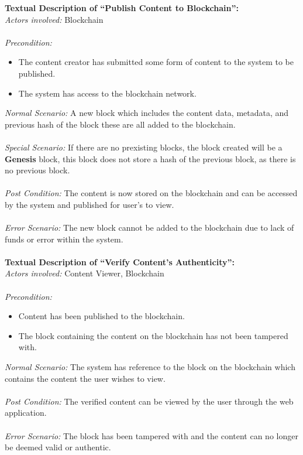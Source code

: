 \noindent
\textbf{Textual Description of “Publish Content to Blockchain”:} \\
\textit{Actors involved:} Blockchain  \\ \\
\textit{Precondition:} 
	\begin{itemize}
		\item The content creator has submitted some form of content to the system to be published.
		\item The system has access to the blockchain network. 
	\end{itemize}
\textit{Normal Scenario:} A new block which includes the content data, metadata, and previous hash of the block
						  these are all added to the blockchain. \\ \\
\textit{Special Scenario:} If there are no prexisting blocks, the block created will be a \textbf{Genesis} block,
						   this block does not store a hash of the previous block, as there is no previous block. \\ \\
\textit{Post Condition:} The content is now stored on the blockchain and can be accessed by the system 
						 and published for user’s to view. \\ \\
\textit{Error Scenario:} The new block cannot be added to the blockchain due to lack of funds 
						 or error within the system. \\ \\

\noindent
\textbf{Textual Description of “Verify Content's Authenticity”:} \\
\textit{Actors involved:} Content Viewer, Blockchain \\ \\
\textit{Precondition:} 
	\begin{itemize}
		\item Content has been published to the blockchain.
		\item The block containing the content on the blockchain has not been tampered with.
	\end{itemize}
\textit{Normal Scenario:} The system has reference to the block on the blockchain which 
						  contains the content the user wishes to view. \\ \\
\textit{Post Condition:} The verified content can be viewed by the user through the web application. \\ \\
\textit{Error Scenario:} The block has been tampered with and the content can no longer be deemed valid or authentic. \\ \\

